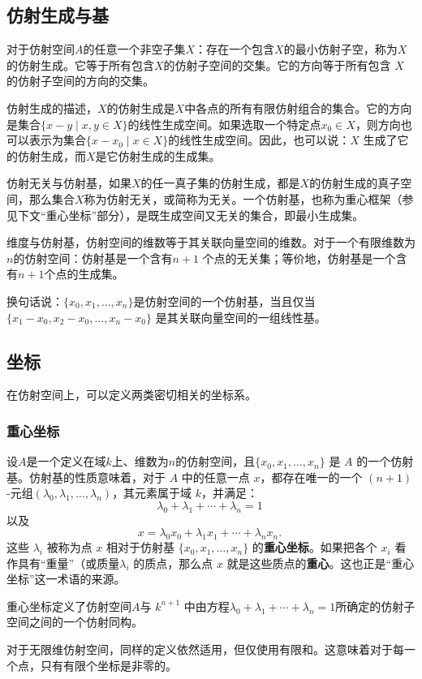 \subsection{仿射生成与基}
对于仿射空间$A$的任意一个非空子集$X$：存在一个包含$X$的最小仿射子空，称为$X$的仿射生成。它等于所有包含$X$的仿射子空间的交集。它的方向等于所有包含 $X$ 的仿射子空间的方向的交集。

仿射生成的描述，$X$的仿射生成是$X$中各点的所有有限仿射组合的集合。它的方向是集合$\{x - y \mid x, y \in X\}$的线性生成空间。如果选取一个特定点$x_0 \in X$，则方向也可以表示为集合$\{x - x_0 \mid x \in X\}$的线性生成空间。因此，也可以说：$X$ 生成了它的仿射生成，而$X$是它仿射生成的生成集。

仿射无关与仿射基，如果$X$的任一真子集的仿射生成，都是$X$的仿射生成的真子空间，那么集合$X$称为仿射无关，或简称为无关。一个仿射基，也称为重心框架（参见下文“重心坐标”部分），是既生成空间又无关的集合，即最小生成集。

维度与仿射基，仿射空间的维数等于其关联向量空间的维数。对于一个有限维数为$n$的仿射空间：仿射基是一个含有$n+1$ 个点的无关集；等价地，仿射基是一个含有$n+1$个点的生成集。

换句话说：$\{x_0, x_1, \ldots, x_n\}$是仿射空间的一个仿射基，当且仅当$\{x_1 - x_0, x_2 - x_0, \ldots, x_n - x_0\}$ 是其关联向量空间的一组线性基。
\subsection{坐标}
在仿射空间上，可以定义两类密切相关的坐标系。
\subsubsection{重心坐标}
设$A$是一个定义在域$k$上、维数为$n$的仿射空间，且$\{x_0, x_1, \dots, x_n\}$ 是 $A$ 的一个仿射基。仿射基的性质意味着，对于 $A$ 中的任意一点 $x$，都存在唯一的一个 $(n+1)$-元组$(\lambda_0, \lambda_1, \dots, \lambda_n)$，其元素属于域 $k$，并满足：
$$
\lambda_0 + \lambda_1 + \cdots + \lambda_n = 1~
$$
以及
$$
x = \lambda_0 x_0 + \lambda_1 x_1 + \cdots + \lambda_n x_n.~
$$
这些 $\lambda_i$ 被称为点 $x$ 相对于仿射基 $\{x_0, x_1, \dots, x_n\}$ 的\textbf{重心坐标}。如果把各个 $x_i$ 看作具有“重量”（或质量$\lambda_i$ 的质点，那么点 $x$ 就是这些质点的\textbf{重心}。这也正是“重心坐标”这一术语的来源。

重心坐标定义了仿射空间$A$与 $k^{n+1}$ 中由方程$\lambda_0 + \lambda_1 + \cdots + \lambda_n = 1$所确定的仿射子空间之间的一个仿射同构。

对于无限维仿射空间，同样的定义依然适用，但仅使用有限和。这意味着对于每一个点，只有有限个坐标是非零的。
